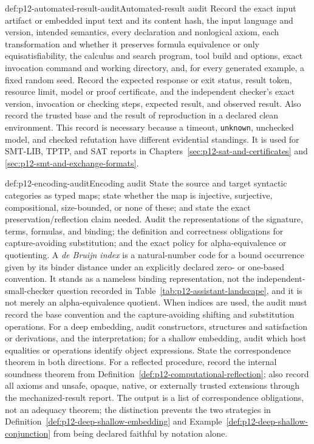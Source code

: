 \begin{hbmethod}{def:p12-automated-result-audit}{Automated-result audit}
Record the exact input artifact or embedded input text and its content hash,
the input language and version, intended semantics, every declaration and
nonlogical axiom, each transformation and whether it preserves
formula equivalence or only equisatisfiability, the calculus and search
program, tool build and options, exact invocation command and working
directory, and, for every generated example, a fixed random seed.  Record the
expected response or exit status, result token, resource limit,
model or proof certificate, and the independent checker's exact version,
invocation or checking steps, expected result, and observed result.  Also
record the trusted base and the result of reproduction in a declared clean
environment.  This record is necessary
because a timeout, \texttt{unknown}, unchecked model, and checked refutation
have different evidential standings.  It is used for SMT-LIB, TPTP, and SAT
reports in Chapters~\ref{sec:p12-sat-and-certificates} and
\ref{sec:p12-smt-and-exchange-formats}.
\end{hbmethod}

\begin{hbmethod}{def:p12-encoding-audit}{Encoding audit}
State the source and target syntactic categories as typed maps; state whether
the map is injective, surjective, compositional, size-bounded, or none of these;
and state the exact preservation/reflection claim needed.  Audit the
representations of the signature, terms, formulas, and binding; the definition
and correctness obligations for capture-avoiding substitution; and the exact
policy for alpha-equivalence or quotienting.  A \emph{de Bruijn index} is a
natural-number code for a bound occurrence given by its binder distance under
an explicitly declared zero- or one-based convention.  It stands as a
nameless binding representation, not the independent-small-checker question
recorded in Table~\ref{tab:p12-assistant-landscape}, and it is not merely
an alpha-equivalence quotient.  When indices are used, the audit must record
the base convention and the capture-avoiding shifting and substitution
operations.  For a deep
embedding, audit constructors, structures and satisfaction or derivations,
and the interpretation; for a shallow embedding, audit which host equalities
or operations identify object expressions.  State the correspondence theorem
in both directions.  For a reflected procedure, record the internal soundness
theorem from Definition~\ref{def:p12-computational-reflection}; also record all
axioms and unsafe, opaque, native, or externally trusted extensions through
the mechanized-result report.  The output is a list of correspondence
obligations, not an adequacy theorem; the distinction prevents the two
strategies in Definition~\ref{def:p12-deep-shallow-embedding} and
Example~\ref{def:p12-deep-shallow-conjunction} from being declared faithful by
notation alone.
\end{hbmethod}

